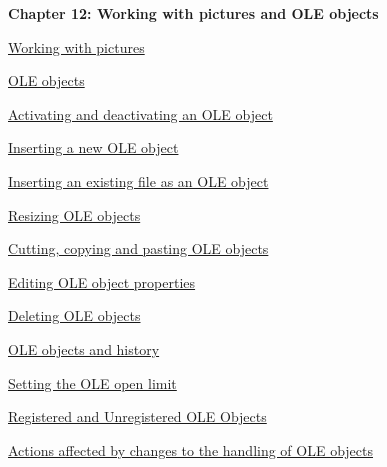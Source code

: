 \documentclass[11pt,a4paper]{article}
\begin{document}
\newpage

\begin{Large}\textbf{Chapter 12: Working with pictures and OLE objects} \end{Large} 
\vspace{1mm}

\href{https://www.ibm.com/support/knowledgecenter/search/Working%20with%20pictures?scope=SSYQBZ_9.6.1}{Working with pictures}

\href{https://www.ibm.com/support/knowledgecenter/search/OLE%20objects?scope=SSYQBZ_9.6.1}{OLE objects}

\href{https://www.ibm.com/support/knowledgecenter/search/Activating%20and%20deactivating%20an%20OLE%20object?scope=SSYQBZ_9.6.1}{Activating and deactivating an OLE object}

\href{https://www.ibm.com/support/knowledgecenter/search/Inserting%20a%20new%20OLE%20object?scope=SSYQBZ_9.6.1}{Inserting a new OLE object}

\href{https://www.ibm.com/support/knowledgecenter/search/Inserting%20an%20existing%20file%20as%20an%20OLE%20object?scope=SSYQBZ_9.6.1}{Inserting an existing file as an OLE object}

\href{https://www.ibm.com/support/knowledgecenter/search/Resizing%20OLE%20objects?scope=SSYQBZ_9.6.1}{Resizing OLE objects}

\href{https://www.ibm.com/support/knowledgecenter/search/Cutting,%20copying%20and%20pasting%20OLE%20objects?scope=SSYQBZ_9.6.1}{Cutting, copying and pasting OLE objects}

\href{https://www.ibm.com/support/knowledgecenter/search/Editing%20OLE%20object%20properties?scope=SSYQBZ_9.6.1}{Editing OLE object properties}

\href{https://www.ibm.com/support/knowledgecenter/search/Deleting%20OLE%20objects?scope=SSYQBZ_9.6.1}{Deleting OLE objects}

\href{https://www.ibm.com/support/knowledgecenter/search/OLE%20objects%20and%20history?scope=SSYQBZ_9.6.1}{OLE objects and history}

\href{https://www.ibm.com/support/knowledgecenter/search/Setting%20the%20OLE%20open%20limit?scope=SSYQBZ_9.6.1}{Setting the OLE open limit}

\href{https://www.ibm.com/support/knowledgecenter/search/Registered%20and%20Unregistered%20OLE%20Objects?scope=SSYQBZ_9.6.1}{Registered and Unregistered OLE Objects}

\href{https://www.ibm.com/support/knowledgecenter/search/Actions%20affected%20by%20changes%20to%20the%20handling%20of%20OLE%20objects?scope=SSYQBZ_9.6.1}{Actions affected by changes to the handling of OLE objects}
\end{document}
